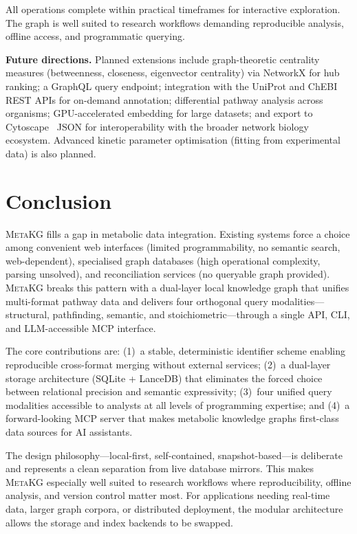 \documentclass[10pt]{article}
\begin{document}
All operations complete within practical timeframes for interactive
exploration. The graph is well suited to research workflows demanding
reproducible analysis, offline access, and programmatic querying.

\textbf{Future directions.} Planned extensions include graph-theoretic
centrality measures (betweenness, closeness, eigenvector centrality) via
NetworkX for hub ranking; a GraphQL query endpoint; integration with the
UniProt and ChEBI REST APIs for on-demand annotation; differential pathway
analysis across organisms; GPU-accelerated embedding for large datasets; and
export to Cytoscape~\citep{shannon2003cytoscape} JSON for interoperability
with the broader network biology ecosystem. Advanced kinetic parameter
optimisation (fitting from experimental data) is also planned.

\section{Conclusion}
\label{sec:conclusion}

\textsc{MetaKG} fills a gap in metabolic data integration. Existing systems
force a choice among convenient web interfaces (limited programmability, no
semantic search, web-dependent), specialised graph databases (high operational
complexity, parsing unsolved), and reconciliation services (no queryable graph
provided). \textsc{MetaKG} breaks this pattern with a dual-layer local
knowledge graph that unifies multi-format pathway data and delivers four
orthogonal query modalities---structural, pathfinding, semantic, and
stoichiometric---through a single API, CLI, and LLM-accessible MCP interface.

The core contributions are: (1)~a stable, deterministic identifier scheme
enabling reproducible cross-format merging without external services; (2)~a
dual-layer storage architecture (SQLite + LanceDB) that eliminates the forced
choice between relational precision and semantic expressivity; (3)~four
unified query modalities accessible to analysts at all levels of programming
expertise; and (4)~a forward-looking MCP server that makes metabolic knowledge
graphs first-class data sources for AI assistants.

The design philosophy---local-first, self-contained, snapshot-based---is
deliberate and represents a clean separation from live database mirrors. This
makes \textsc{MetaKG} especially well suited to research workflows where
reproducibility, offline analysis, and version control matter most. For
applications needing real-time data, larger graph corpora, or distributed
deployment, the modular architecture allows the storage and index backends to
be swapped.
\end{document}
